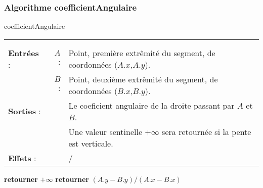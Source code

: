 \documentclass[10pt]{article}
\begin{document}
\subsubsection{Algorithme coefficientAngulaire}
\begin{algorithm}
\caption{coefficientAngulaire}
\begin{tabular}{lrl}
\multicolumn{3}{l}{\makecell[l]{Calcule le coefficient angulaire d'un segment. Renvoie la valeur sentinelle $+\infty$ si le segment est vertical.}}\\
&&\\
\textbf{Entrées} : &$A$ : &Point, première extrêmité du segment, de coordonnées ($A.x$,$A.y$).\\
&$B$ :&Point, deuxième extrêmité du segment, de coordonnées ($B.x$,$B.y$).\\
\textbf{Sorties} :& &Le coeficient angulaire de la droite passant par $A$ et $B$.\\
& &Une valeur sentinelle $+\infty$ sera retournée si la pente est verticale.\\
\textbf{Effets} :& &/
\end{tabular}
\begin{algorithmic}[1]
\State \textbf{retourner} $+\infty$
\Else
\State \textbf{retourner} $(A.y-B.y)/(A.x-B.x)$
\EndIf
\EndProcedure
\end{algorithmic}
\end{algorithm}
\end{document}
